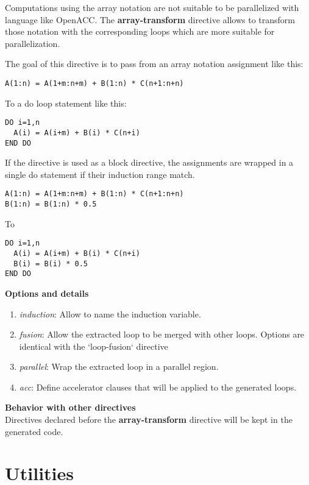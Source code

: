 \documentclass{article}
\begin{document}
Computations using the array notation are not suitable to be parallelized with
language like OpenACC. The \textbf{array-transform} directive allows to transform those
notation with the corresponding loops which are more suitable for
parallelization.

The goal of this directive is to pass from an array notation assignment like
this:

\begin{lstlisting}
A(1:n) = A(1+m:n+m) + B(1:n) * C(n+1:n+n)
\end{lstlisting}

To a do loop statement like this:

\begin{lstlisting}
DO i=1,n
  A(i) = A(i+m) + B(i) * C(n+i)
END DO
\end{lstlisting}

If the directive is used as a block directive, the assignments are wrapped in
a single do statement if their induction range match.

\begin{lstlisting}
A(1:n) = A(1+m:n+m) + B(1:n) * C(n+1:n+n)
B(1:n) = B(1:n) * 0.5
\end{lstlisting}

To

\begin{lstlisting}
DO i=1,n
  A(i) = A(i+m) + B(i) * C(n+i)
  B(i) = B(i) * 0.5
END DO
\end{lstlisting}


\textbf{Options and details}
\begin{enumerate}
\item \textit{induction}: Allow to name the induction variable.
\item \textit{fusion}: Allow the extracted loop to be merged with other loops. Options 
are identical with the `loop-fusion` directive
\item \textit{parallel}: Wrap the extracted loop in a parallel region.
\item \textit{acc}: Define accelerator clauses that will be applied to the generated loops.
\end{enumerate}

\textbf{Behavior with other directives}\\
Directives declared before the \textbf{array-transform} directive will be kept in the
generated code.

\section{Utilities}
\end{document}
